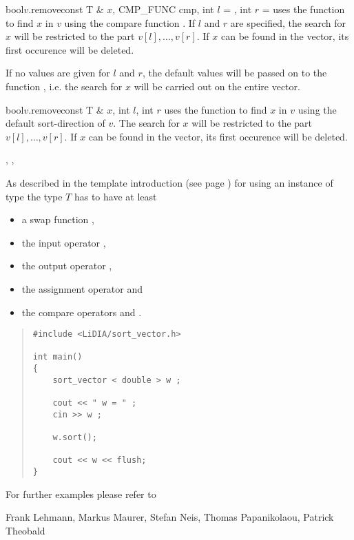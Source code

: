\begin{fcode}{bool}{$v$.remove}{const T & $x$, CMP_FUNC cmp, int $l$ = \DEF, int $r$ = \DEF}
  uses the function  to find $x$ in $v$ using the compare function
  .  If $l$ and $r$ are specified, the search for $x$ will be restricted to the
  part $v[l], \dots, v[r]$.  If $x$ can be found in the vector, its first occurence will be
  deleted.
  
  If no values are given for $l$ and $r$, the default values will be passed on to the function
  , i.e. the search for $x$ will be carried out on the entire vector.
\end{fcode}

\begin{fcode}{bool}{$v$.remove}{const T & $x$, int $l$, int $r$}
  uses the function  to find $x$ in $v$ using the default sort-direction of
  $v$.  The search for $x$ will be restricted to the part $v[l], \dots, v[r]$.  If $x$ can be
  found in the vector, its first occurence will be deleted.
\end{fcode}



\SEEALSO

, ,



\NOTES

As described in the template introduction (see page \pageref{template_introduction}) for using
an instance of type  the type $T$ has to have at least
\begin{itemize}
\item a swap function ,
\item the input operator \code{>>},
\item the output operator \code{<<},
\item the assignment operator \code{=} and
\item the compare operators \code{<} and \code{>}.
\end{itemize}



\EXAMPLES

\begin{quote}
\begin{verbatim}
#include <LiDIA/sort_vector.h>

int main()
{
    sort_vector < double > w ;

    cout << " w = " ;
    cin >> w ;

    w.sort();

    cout << w << flush;
}
\end{verbatim}
\end{quote}

For further examples please refer to 



\AUTHOR

Frank Lehmann, Markus Maurer, Stefan Neis, Thomas Papanikolaou, Patrick
Theobald
